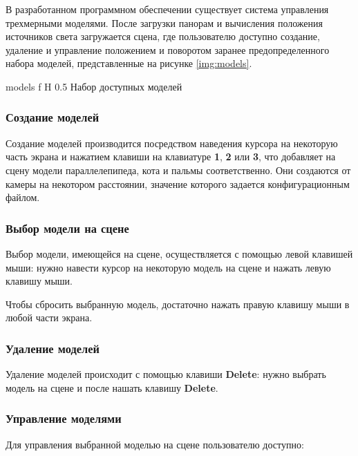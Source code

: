 В разработанном программном обеспечении существует система управления трехмерными моделями. После загрузки панорам и вычисления положения источников света загружается сцена, где пользователю доступно создание, удаление и управление положением и поворотом заранее предопределенного набора моделей, представленные на рисунке \ref{img:models}. 

{models}
{f}
{H}
{0.5\textwidth}
{Набор доступных моделей}

\subsubsection*{Создание моделей}

Создание моделей производится посредством наведения курсора на некоторую часть экрана и нажатием клавиши на клавиатуре \textbf{1}, \textbf{2} или \textbf{3}, что добавляет на сцену модели параллелепипеда, кота и пальмы соответственно. Они создаются от камеры на некотором расстоянии, значение которого задается конфигурационным файлом.

\subsubsection*{Выбор модели на сцене}

Выбор модели, имеющейся на сцене, осуществляется с помощью левой клавишей мыши: нужно навести курсор на некоторую модель на сцене и нажать левую клавишу мыши. 

Чтобы сбросить выбранную модель, достаточно нажать правую клавишу мыши в любой части экрана.

\subsubsection*{Удаление моделей}

Удаление моделей происходит с помощью клавиши \textbf{Delete}: нужно выбрать модель на сцене и после нашать клавишу \textbf{Delete}.

\subsubsection*{Управление моделями}

Для управления выбранной моделью на сцене пользователю доступно:

